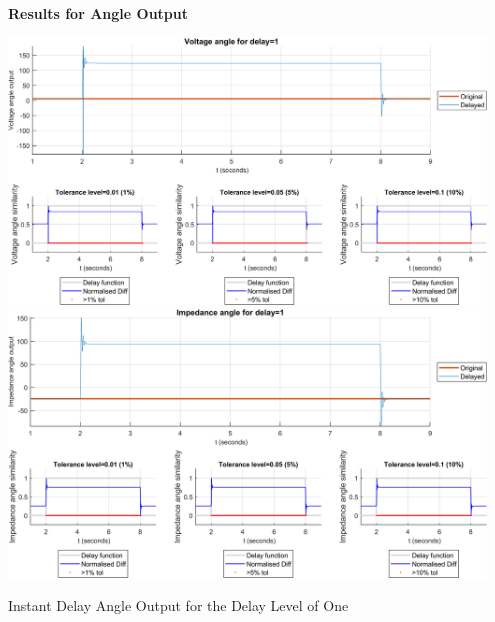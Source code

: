 {\newpage \textbf{Results for Angle Output}
\begin{floatingfigure}[p]{\textwidth}
    \includegraphics[width=0.95\textwidth]{PMUsim-figures/DelayOf_1/Instant_vAngle.png}    
    \includegraphics[width=0.95\textwidth]{PMUsim-figures/DelayOf_1/Instant_iAngle.png}    
      \label{fig:PMUsim_One_Angle}
    \caption{Instant Delay Angle Output for the Delay Level of One}
\end{floatingfigure}

}
